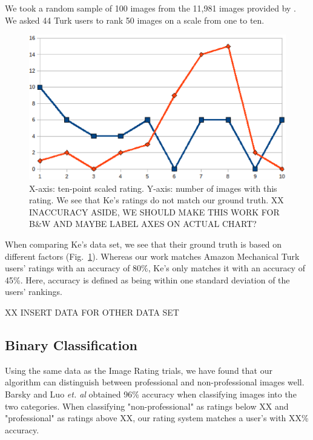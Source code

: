 \documentclass[10pt,twocolumn,letterpaper]{article}
\begin{document}
We took a random sample of 100 images from the 11,981 images provided by \cite{springerlink:10.1007/978-3-540-88690-7_29}. We asked 44 Turk users to rank 50 images on a scale from one to ten.

\begin{figure}
  \centering
    \includegraphics[scale=0.40,clip]{ke_vs_us.eps}
  \caption{X-axis: ten-point scaled rating.  Y-axis: number of images with this rating. We see that Ke's ratings do not match our ground truth. XX INACCURACY ASIDE, WE SHOULD MAKE THIS WORK FOR B\&W AND MAYBE LABEL AXES ON ACTUAL CHART?}
  \label{fig:ke_vs_us}
\end{figure}
When comparing Ke's data set, we see that their ground truth is based on different factors (Fig.~\ref{fig:ke_vs_us}). Whereas our work matches Amazon Mechanical Turk users' ratings with an accuracy of 80\%, Ke's only matches it with an accuracy of 45\%. Here, accuracy is defined as being within one standard deviation of the users' rankings.

XX INSERT DATA FOR OTHER DATA SET

\subsection{Binary Classification} Using the same data as the Image Rating trials, we have found that our algorithm can distinguish between professional and non-professional images well. Barsky \cite{Yeh:2010:PPR:1873951.1873963} and Luo \emph{et. al}\cite{springerlink:10.1007/978-3-540-88690-7_29} obtained 96\% accuracy when classifying images into the two categories. When classifying "non-professional" as ratings below XX and "professional" as ratings above XX, our rating system matches a user's with XX\% accuracy.
\end{document}
